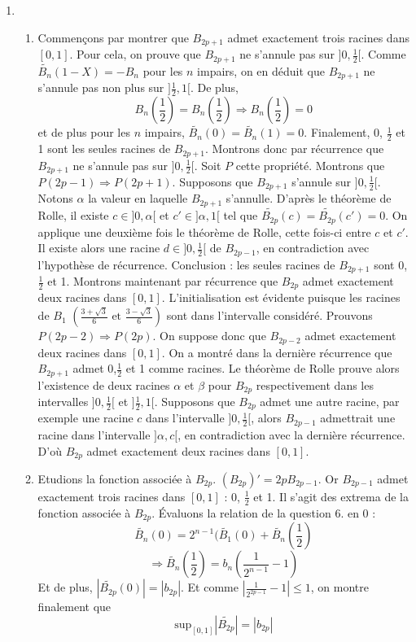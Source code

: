 \begin{enumerate}
\item
\begin{enumerate}
\item Commençons par montrer que $B_{2p+1}$ admet exactement trois racines dans $[0,1]$. Pour cela, on prouve que $B_{2p+1}$ ne s'annule pas sur $]0,\frac{1}{2}[$. Comme $\widetilde{B_n}(1-X)=-B_n$ pour les $n$ impairs, on en déduit que $B_{2p+1}$ ne s'annule pas non plus sur $]\frac{1}{2},1[$. De plus,
		\[B_n(\frac{1}{2})=B_n(\frac{1}{2}) \Rightarrow B_n(\frac{1}{2})=0\]
et de plus pour les $n$ impairs, $\widetilde{B_n}(0)=\widetilde{B_n}(1)=0$. Finalement, 0, $\frac{1}{2}$ et 1 sont les seules racines de $B_{2p+1}$.\newline
Montrons donc par récurrence que $B_{2p+1}$ ne s'annule pas sur $]0,\frac{1}{2}[$. Soit $P$ cette propriété. Montrons que $P(2p-1)\Rightarrow P(2p+1)$.\newline 
Supposons que $B_{2p+1}$ s'annule sur $]0,\frac{1}{2}[$. Notons $\alpha$ la valeur en laquelle $B_{2p+1}$ s'annulle.  D'après le théorème de Rolle, il existe $c\in ]0,\alpha[$ et $c' \in ]\alpha,1[$ tel que $\widetilde{B_{2p}}(c)=\widetilde{B_{2p}}(c')=0$. On applique une deuxième fois le théorème de Rolle, cette fois-ci entre $c$ et $c'$. Il existe alors une racine $d \in ]0,\frac{1}{2}[$ de $B_{2p-1}$, en contradiction avec l'hypothèse de récurrence.\newline 
Conclusion : les seules racines de $B_{2p+1}$ sont 0,$\frac{1}{2}$ et 1.\newline
Montrons maintenant par récurrence que $B_{2p}$ admet exactement deux racines dans $[0,1]$. L'initialisation est évidente puisque les racines de $B_1$ $\left(\frac{3+\sqrt{3}}{6} \text{ et } \frac{3-\sqrt{3}}{6} \right)$ sont dans l'intervalle considéré. Prouvons $P(2p-2)\Rightarrow P(2p)$. On suppose donc que $B_{2p-2}$ admet exactement deux racines dans $[0,1]$. On a montré dans la dernière récurrence que $B_{2p+1}$ admet 0,$\frac{1}{2}$ et 1 comme racines. Le théorème de Rolle prouve alors l'existence de deux racines $\alpha$ et $\beta$ pour $B_{2p}$ respectivement dans les intervalles $]0,\frac{1}{2}[$ et $]\frac{1}{2},1[$. Supposons que $B_{2p}$ admet une autre racine, par exemple une racine $c$ dans l'intervalle $]0,\frac{1}{2}[$, alors $B_{2p-1}$ admettrait une racine dans l'intervalle $]\alpha, c[$, en contradiction avec la dernière récurrence.\newline 
D'où $B_{2p}$ admet exactement deux racines dans $[0,1]$.
		
\item Etudions la fonction associée à $B_{2p}$. $(B_{2p})'=2pB_{2p-1}$. Or $B_{2p-1}$ admet exactement trois racines dans $[0,1]$ : 0, $\frac{1}{2}$ et 1. Il s'agit des extrema de la fonction associée à $B_{2p}$. \'Evaluons la relation de la question 6. en 0 :
		\[\widetilde{B_n}(0)=2^{n-1}(\widetilde{B_1}(0)+\widetilde{B_n}(\frac{1}{2})\]
		\[\Rightarrow \widetilde{B_n}(\frac{1}{2})=b_n(\frac{1}{2^{n-1}}-1)\]
Et de plus, $\left|\widetilde{B_{2p}}(0)\right|=\left|b_{2p}\right|$. Et comme $\left|\frac{1}{2^{2p-1}}-1\right|\leq 1$, on montre finalement que
		\[\text{sup}_{[0,1]}\left|\widetilde{B_{2p}}\right|=\left|b_{2p}\right|\]
		

\end{enumerate}
\end{enumerate}
